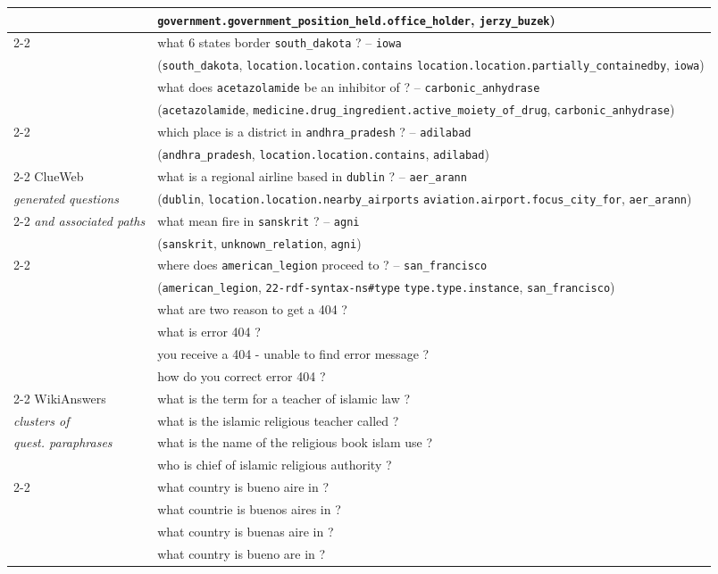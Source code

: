 \documentclass[runningheads,a4paper]{llncs}
\newcommand{\wk}{{\sc WikiAnswers}\xspace}
\newcommand{\cw}{{\sc ClueWeb}\xspace}
\newcommand{\ent}[1]{{\small {\tt #1}}}
\begin{document}
\begin{table*}[t!]
\begin{center}
{\begin{tabular}{|l|l|}
&\ent{government.government\_position\_held.office\_holder},  \ent{jerzy\_buzek}) \\ 
\cline{2-2}
& what 6 states border \ent{south\_dakota} ? -- \ent{iowa}\\
& (\ent{south\_dakota}, \ent{location.location.contains}
\ent{location.location.partially\_containedby},  \ent{iowa}) \\
\hline
\hline
& what does \ent{acetazolamide} be an inhibitor of ? -- \ent{carbonic\_anhydrase}\\
& (\ent{acetazolamide}, \ent{medicine.drug\_ingredient.active\_moiety\_of\_drug}, \ent{carbonic\_anhydrase})\\
\cline{2-2}
& which place is a district in \ent{andhra\_pradesh} ? -- \ent{adilabad}\\
& (\ent{andhra\_pradesh}, \ent{location.location.contains}, \ent{adilabad}) \\
\cline{2-2}
\cw & what is a regional airline based in \ent{dublin} ? -- \ent{aer\_arann} \\
{\it generated questions} & (\ent{dublin}, \ent{location.location.nearby\_airports} \ent{aviation.airport.focus\_city\_for},  \ent{aer\_arann})\\
\cline{2-2}
{\it and associated paths} & what mean fire in \ent{sanskrit} ? -- \ent{agni}\\
& (\ent{sanskrit}, \ent{unknown\_relation}, \ent{agni}) \\
\cline{2-2}
& where does \ent{american\_legion} proceed to ? -- \ent{san\_francisco}\\  
& (\ent{american\_legion}, \ent{22-rdf-syntax-ns\#type} \ent{type.type.instance}, \ent{san\_francisco})  \\
\hline 
\hline 
& what are two reason to get a 404 ? \\
& what is error 404 ? \\
& you receive a 404 - unable to find error message ?\\
& how do you correct error 404 ?\\
\cline{2-2}
\wk & what is the term for a teacher of islamic law ?\\
{\it clusters of } & what is the islamic religious teacher called ?\\
{\it quest. paraphrases } & what is the name of the religious book islam use ?\\
& who is chief of islamic religious authority ?\\
\cline{2-2}
& what  country is bueno aire in ?\\
& what countrie is buenos aires in ?\\
& what country is buenas aire in ?\\
&  what country is bueno are in ?\\
\hline 
\end{tabular}
}
\caption{\label{tab:ex} Examples of questions, answer paths and paraphrases  used in this
paper.}
\end{center}
\end{table*}
\end{document}
